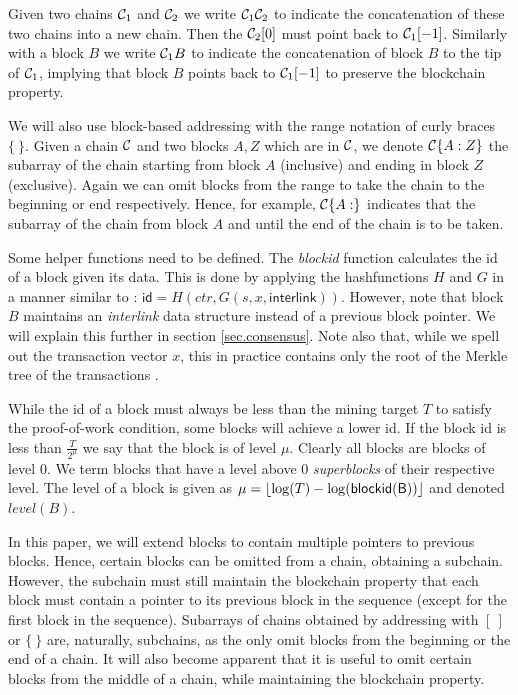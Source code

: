 Given two chains $\mathcal{C}_1$ and $\mathcal{C}_2$ we write $\mathcal{C}_1 \mathcal{C}_2$ to
indicate the concatenation of these two chains into a new chain. Then the
$\mathcal{C}_2[0]$ must point back to $\mathcal{C}_1[-1]$. Similarly with a block $B$ we
write $\mathcal{C}_1 B$ to indicate the concatenation of block $B$ to the tip of
$\mathcal{C}_1$, implying that block $B$ points back to $\mathcal{C}_1[-1]$ to preserve
the blockchain property.

We will also use block-based addressing with the range notation of curly braces $\{~\}$.
Given a chain $\mathcal{C}$ and two blocks $A, Z$ which are in $\mathcal{C}$, we denote
$\mathcal{C}\{A:Z\}$ the subarray of the chain starting from block $A$ (inclusive)
and ending in block $Z$ (exclusive). Again we can omit blocks from the range to
take the chain to the beginning or end respectively. Hence, for example,
$\mathcal{C}\{A:\}$ indicates that the subarray of the chain from block $A$ and until
the end of the chain is to be taken.

Some helper functions need to be defined. The \textit{blockid} function
calculates the id of a block given its data. This is done by applying the
hashfunctions $H$ and $G$ in a manner similar to \cite{backbone}: $\textsf{id} =
H(ctr, G(s, x, \textsf{interlink}))$. However, note that block $B$ maintains an
\textit{interlink} data structure instead of a previous block pointer. We will
explain this further in section \ref{sec.consensus}. Note also that, while we
spell out the transaction vector $x$, this in practice contains only the root of
the Merkle tree of the transactions \cite{princetonbook}.

While the id of a block must always be less than the mining target $T$ to
satisfy the proof-of-work condition\cite{antonopoulosbook}, some blocks will
achieve a lower id. If the block id is less than $\frac{T}{2^\mu}$ we say that
the block is of level $\mu$. Clearly all blocks are blocks of level $0$. We term
blocks that have a level above 0 \textit{superblocks} of their respective level.
The level of a block is given as $\mu = \left \lfloor \log(T) -
\log(\sf{blockid}(B)) \right \rfloor$ and denoted $\textit{level}(B)$.

In this paper, we will extend blocks to contain multiple pointers to previous
blocks. Hence, certain blocks can be omitted from a chain, obtaining a subchain.
However, the subchain must still maintain the blockchain property that each
block must contain a pointer to its previous block in the sequence (except for
the first block in the sequence). Subarrays of chains obtained by addressing
with $[~]$ or $\{~\}$ are, naturally, subchains, as the only omit blocks from
the beginning or the end of a chain. It will also become apparent that it is
useful to omit certain blocks from the middle of a chain, while maintaining the
blockchain property.

